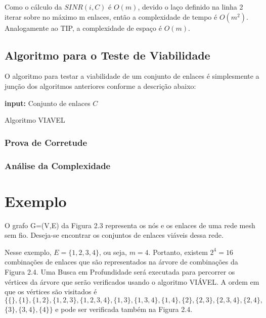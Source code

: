 Como o cálculo da $SINR(i,C)$ é $O(m)$, devido o laço definido na linha 2 iterar sobre no máximo m enlaces, então a complexidade de tempo é $O(m^2)$. Analogamente ao TIP, a complexidade de espaço é $O(m)$.

\subsection{Algoritmo para o Teste de Viabilidade}

O algoritmo para testar a viabilidade de um conjunto de enlaces é simplesmente a junção dos algoritmos anteriores conforme a descrição abaixo:

\begin{algorithm}[h]
	\SetVline
	{\bf input:} Conjunto de enlaces $C$\\
\caption{Algoritmo VIAVEL}
\label{alg:viavel}
\end{algorithm}

\subsubsection{Prova de Corretude}

\subsubsection{Análise da Complexidade}

\section{Exemplo}

O grafo G=(V,E) da Figura 2.3 representa os nós e os enlaces de uma rede mesh sem fio. Deseja-se encontrar os conjuntos de enlaces viáveis dessa rede. 


Nesse exemplo, $E=\{1, 2, 3, 4\}$, ou seja, $m=4$. Portanto, existem $2^4 = 16$ combinações de enlaces que são representados na árvore de combinações da Figura 2.4. Uma Busca em Profundidade será executada para percorrer os vértices da árvore que serão verificados usando o algoritmo VIÁVEL. A ordem em que os vértices são visitados é $\{\{\}, \{1\}, \{1,2\}, \{1,2,3\}, \{1,2,3,4\}, \{1,3\}, \{1,3,4\}, \{1,4\}, \{2\}, \{2,3\}, \{2,3,4\}, \{2,4\},$ $\{3\}, \{3,4\}, \{4\}\}$ e pode ser verificada também na Figura 2.4.



